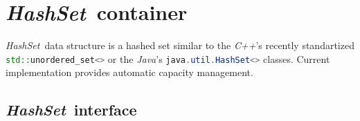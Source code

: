\documentclass[a4paper]{article}
\newcommand{\Cpp}{\emph{C++}}
\newcommand{\Java}{\emph{Java}}
\begin{document}


\newcommand{\Hashset}{\emph{HashSet}}
\section{\Hashset\ container}


\Hashset\ data structure is a hashed set similar to the \Cpp's recently standartized \lstinline[language=C++]{std::unordered_set<>} or the \Java's \lstinline[language=Java]{java.util.HashSet<>} classes.
Current implementation provides automatic capacity management.


\subsection{\Hashset\ interface}
\end{document}
